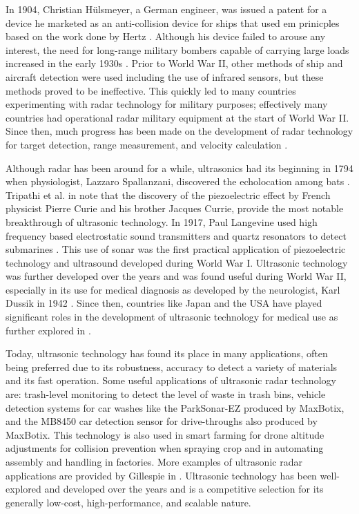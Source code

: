\documentclass[class=report,11pt,crop=false]{standalone}
\begin{document}
In 1904, Christian H\"ulsmeyer, a German engineer, was issued a patent for a device he marketed as an anti-collision device for ships that used \gls{em} prinicples based on the work done by Hertz \cite{swords}. Although his device failed to arouse any interest, the need for long-range military bombers capable of carrying large loads increased in the early 1930s \cite{pomr, mitlecture}. Prior to World War II, other methods of ship and aircraft detection were used including the use of infrared sensors, but these methods proved to be ineffective. This quickly led to many countries experimenting with radar technology for military purposes; effectively many countries had operational radar military equipment at the start of World War II. Since then, much progress has been made on the development of radar technology for target detection, range measurement, and velocity calculation \cite{skolnik}. 

Although radar has been around for a while, ultrasonics had its beginning in 1794 when physiologist, Lazzaro Spallanzani, discovered the echolocation among bats \cite{tripathi}. Tripathi et al. in \cite{tripathi} note that the discovery of the piezoelectric effect by French physicist Pierre Curie and his brother Jacques Currie, provide the most notable breakthrough of ultrasonic technology. In 1917, Paul Langevine used high frequency based electrostatic sound transmitters and quartz resonators to detect submarines \cite{bok}. This use of sonar was the first practical application of piezoelectric technology and ultrasound developed during World War I. Ultrasonic technology was further developed over the years and was found useful during World War II, especially in its use for medical diagnosis as developed by the neurologist, Karl Dussik in 1942 \cite{dussik}. Since then, countries like Japan and the USA have played significant roles in the development of ultrasonic technology for medical use as further explored in \cite{tripathi}.

Today, ultrasonic technology has found its place in many applications, often being preferred due to its robustness, accuracy to detect a variety of materials and its fast operation. Some useful applications of ultrasonic radar technology are: trash-level monitoring to detect the level of waste in trash bins, vehicle detection systems for car washes like the ParkSonar-EZ produced by MaxBotix, and the MB8450 car detection sensor for drive-throughs also produced by MaxBotix. This technology is also used in smart farming for drone altitude adjustments for collision prevention when spraying crop and in automating assembly and handling in factories. More examples of ultrasonic radar applications are provided by Gillespie in \cite{gillespie}. Ultrasonic technology has been well-explored and developed over the years and is a competitive selection for its generally low-cost, high-performance, and scalable nature.
\end{document}
